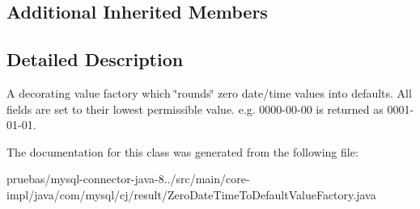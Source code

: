 \subsection*{Additional Inherited Members}


\subsection{Detailed Description}
A decorating value factory which \char`\"{}rounds\char`\"{} zero date/time values into defaults. All fields are set to their lowest permissible value. e.\+g. 0000-\/00-\/00 is returned as 0001-\/01-\/01. 

The documentation for this class was generated from the following file\+:\begin{DoxyCompactItemize}
\item 
pruebas/mysql-\/connector-\/java-\/8../src/main/core-\/impl/java/com/mysql/cj/result/Zero\+Date\+Time\+To\+Default\+Value\+Factory.\+java\end{DoxyCompactItemize}
